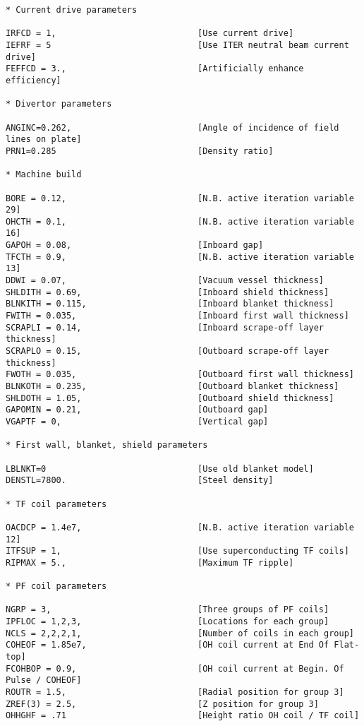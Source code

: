 \documentclass[11pt,a4paper]{report}
\begin{document}
\begin{verbatim}
* Current drive parameters

IRFCD = 1,                            [Use current drive]
IEFRF = 5                             [Use ITER neutral beam current drive]
FEFFCD = 3.,                          [Artificially enhance efficiency]

* Divertor parameters

ANGINC=0.262,                         [Angle of incidence of field lines on plate]
PRN1=0.285                            [Density ratio]

* Machine build

BORE = 0.12,                          [N.B. active iteration variable 29]
OHCTH = 0.1,                          [N.B. active iteration variable 16]
GAPOH = 0.08,                         [Inboard gap]
TFCTH = 0.9,                          [N.B. active iteration variable 13]
DDWI = 0.07,                          [Vacuum vessel thickness]
SHLDITH = 0.69,                       [Inboard shield thickness]
BLNKITH = 0.115,                      [Inboard blanket thickness]
FWITH = 0.035,                        [Inboard first wall thickness]
SCRAPLI = 0.14,                       [Inboard scrape-off layer thickness]
SCRAPLO = 0.15,                       [Outboard scrape-off layer thickness]
FWOTH = 0.035,                        [Outboard first wall thickness]
BLNKOTH = 0.235,                      [Outboard blanket thickness]
SHLDOTH = 1.05,                       [Outboard shield thickness]
GAPOMIN = 0.21,                       [Outboard gap]
VGAPTF = 0,                           [Vertical gap]

* First wall, blanket, shield parameters

LBLNKT=0                              [Use old blanket model]
DENSTL=7800.                          [Steel density]

* TF coil parameters

OACDCP = 1.4e7,                       [N.B. active iteration variable 12]
ITFSUP = 1,                           [Use superconducting TF coils]
RIPMAX = 5.,                          [Maximum TF ripple]

* PF coil parameters

NGRP = 3,                             [Three groups of PF coils]
IPFLOC = 1,2,3,                       [Locations for each group]
NCLS = 2,2,2,1,                       [Number of coils in each group]
COHEOF = 1.85e7,                      [OH coil current at End Of Flat-top]
FCOHBOP = 0.9,                        [OH coil current at Begin. Of Pulse / COHEOF]
ROUTR = 1.5,                          [Radial position for group 3]
ZREF(3) = 2.5,                        [Z position for group 3]
OHHGHF = .71                          [Height ratio OH coil / TF coil]


\end{verbatim}
\end{document}
